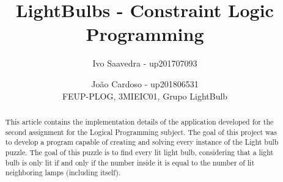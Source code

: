 \documentclass[runningheads]{llncs}
\begin{document}
%
\title{LightBulbs - Constraint Logic Programming}
%
%
\author{Ivo Saavedra - up201707093\and
João Cardoso - up201806531 \\
\small{FEUP-PLOG, 3MIEIC01, Grupo LightBulb}}

%
%
%
\maketitle              %
%
\begin{abstract}
This article contains the implementation details of the application developed for the second assignment for the
Logical Programming subject. The goal of this project was to develop a program capable of creating and solving every instance of the Light bulb puzzle. The goal of this puzzle is to find every lit light bulb, considering that a light bulb is only lit if and only if the number inside it is equal to the number of lit neighboring lamps (including itself).

\end{abstract}
%
%
%
\end{document}
